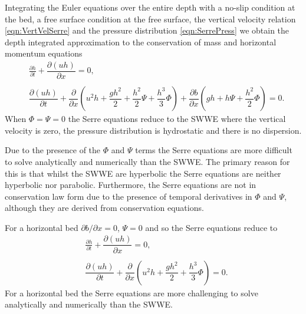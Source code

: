 Integrating the Euler equations \cite{Su-Gardener-1969-536,Zoppou-2014} over the entire depth with a no-slip condition at the bed, a free surface condition at the free surface, the vertical velocity relation \eqref{eqn:VertVelSerre} and the pressure distribution \eqref{eqn:SerrePress} we obtain the depth integrated approximation to the conservation of mass and horizontal momentum equations
\begin{subequations}
	\begin{align}
	&\frac{\partial h}{\partial t} + \dfrac{\partial (uh)}{\partial x} = 0,  \label{eqn:FullSerreNonConMass} \\ \nonumber \\
	&\dfrac{\partial (uh)}{\partial t} + \dfrac{\partial}{\partial x} \left ( u^2h + \dfrac{gh^2}{2} + \dfrac{h^2}{2}{\Psi} + \dfrac{h^3}{3}{ \Phi }  \right )  +  \dfrac{\partial b}{\partial x} \left (gh +   h \Psi + \dfrac{h^2}{2}{ \Phi }  \right ) = 0.	\label{eqn:FullSerreNonConMome}
	\end{align}
	\label{eqn:FullSerreNonCon}
\end{subequations}
When $\Phi = \Psi = 0$ the Serre equations reduce to the SWWE where the vertical velocity is zero, the pressure distribution is hydrostatic and there is no dispersion. 

Due to the presence of the $\Phi$ and $\Psi$ terms the Serre equations are more difficult to solve analytically and numerically than the SWWE. The primary reason for this is that whilst the SWWE are hyperbolic the Serre equations are neither hyperbolic nor parabolic. Furthermore, the Serre equations are not in conservation law form due to the presence of temporal derivatives in $\Phi$ and $\Psi$, although they are derived from conservation equations. 

For a horizontal bed $\partial b / \partial x = 0$, $\Psi = 0$ and so the Serre equations reduce to
\begin{subequations}
	\label{eqn:FullSerreNonConHorizbed}
	\begin{align}
	\label{eqn:FullSerreNonConMassHorizbed}
	&\frac{\partial h}{\partial t} + \dfrac{\partial (uh)}{\partial x} = 0, \\ \nonumber \\
	\label{eqn:FullSerreNonConMomeHorizbed}
	&\dfrac{\partial (uh)}{\partial t} + \dfrac{\partial}{\partial x} \left ( u^2h + \dfrac{gh^2}{2} + \dfrac{h^3}{3}{ \Phi }  \right ) = 0.
	\end{align}
\end{subequations}	
For a horizontal bed the Serre equations are more challenging to solve analytically and numerically than the SWWE. 

